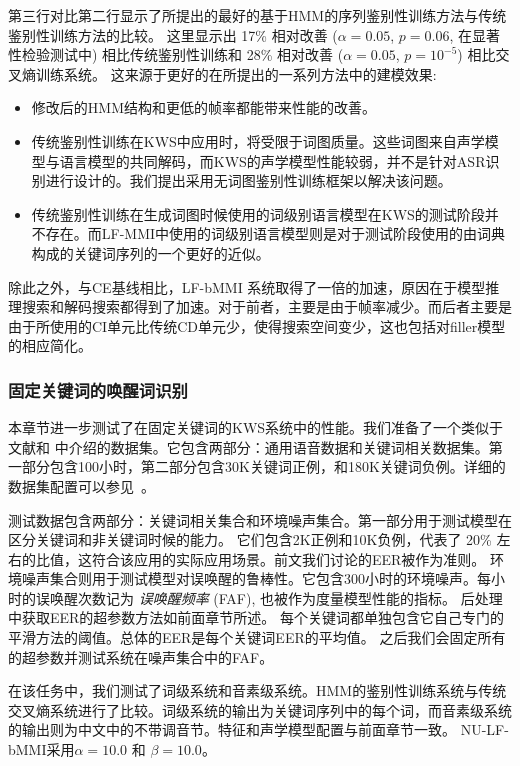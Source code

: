 第三行对比第二行显示了所提出的最好的基于HMM的序列鉴别性训练方法与传统鉴别性训练方法的比较。
这里显示出 17\% 相对改善 ($\alpha = 0.05$, $p = 0.06$, 在显著性检验测试中) 相比传统鉴别性训练和 28\% 相对改善 ($\alpha = 0.05$, $p = 10^{-5}$)  相比交叉熵训练系统。
这来源于更好的在所提出的一系列方法中的建模效果:
\begin{itemize}
 \item 修改后的HMM结构和更低的帧率都能带来性能的改善。
 \item 传统鉴别性训练在KWS中应用时，将受限于词图质量。这些词图来自声学模型与语言模型的共同解码，而KWS的声学模型性能较弱，并不是针对ASR识别进行设计的。我们提出采用无词图鉴别性训练框架以解决该问题。
 \item 传统鉴别性训练在生成词图时候使用的词级别语言模型在KWS的测试阶段并不存在。而LF-MMI中使用的词级别语言模型则是对于测试阶段使用的由词典构成的关键词序列的一个更好的近似。
\end{itemize}
除此之外，与CE基线相比，LF-bMMI 系统取得了一倍的加速，原因在于模型推理搜索和解码搜索都得到了加速。对于前者，主要是由于帧率减少。而后者主要是由于所使用的CI单元比传统CD单元少，使得搜索空间变少，这也包括对filler模型的相应简化。


\subsubsection{固定关键词的唤醒词识别}
\label{Sec:exp-wakeup-word-rec}

本章节进一步测试了在固定关键词的KWS系统中的性能。我们准备了一个类似于文献\cite{chen2014small}和  \cite{cas-icassp17}中介绍的数据集。它包含两部分：通用语音数据和关键词相关数据集。第一部分包含100小时，第二部分包含30K关键词正例，和180K关键词负例。详细的数据集配置可以参见~\cite{chen2018kws}。

测试数据包含两部分：关键词相关集合和环境噪声集合。第一部分用于测试模型在区分关键词和非关键词时候的能力\cite{chen2014small}。 它们包含2K正例和10K负例，代表了 20\% 左右的比值，这符合该应用的实际应用场景。前文我们讨论的EER被作为准则。
环境噪声集合则用于测试模型对误唤醒的鲁棒性\cite{cas-icassp17}。它包含300小时的环境噪声。每小时的误唤醒次数记为 {\em{误唤醒频率}} (FAF), 也被作为度量模型性能的指标。
后处理中获取EER的超参数方法如前面章节所述。
每个关键词都单独包含它自己专门的平滑方法的阈值。总体的EER是每个关键词EER的平均值。
之后我们会固定所有的超参数并测试系统在噪声集合中的FAF。

在该任务中，我们测试了词级系统和音素级系统。HMM的鉴别性训练系统与传统交叉熵系统进行了比较。词级系统的输出为关键词序列中的每个词，而音素级系统的输出则为中文中的不带调音节。特征和声学模型配置与前面章节一致。
NU-LF-bMMI采用$\alpha=10.0$ 和 $\beta=10.0$。

